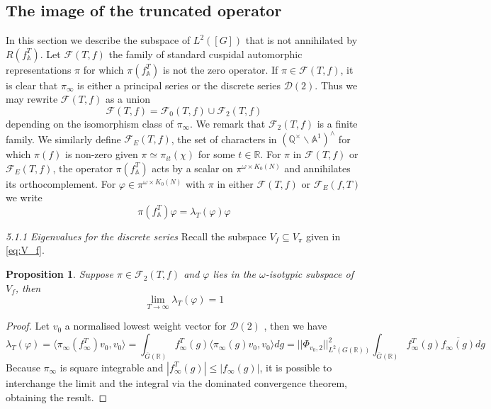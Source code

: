 \documentclass{article}
\newtheorem{proposition}[theorem]{Proposition}
\numberwithin{equation}{section}
\begin{document}
\subsection{The image of the truncated operator}
In this section we describe the subspace of $L^2([G])$ that is not annihilated by $R(f_\mathbb{A}^T)$. Let $\mathcal{F}(T,f)$ the family of standard cuspidal automorphic representations $\pi$ for which $\pi(f_\mathbb{A}^T)$ is not the zero operator. If $\pi \in \mathcal{F}(T,f)$, it is clear that $\pi_\infty$ is either a principal series or the discrete series $\mathcal{D}(2)$. Thus we may rewrite $\mathcal{F}(T,f)$ 
as a union
\begin{equation}
\mathcal{F}(T,f) = \mathcal{F}_0(T,f)\cup\mathcal{F}_2(T,f)
\end{equation}
depending on the isomorphism class of $\pi_\infty$. We remark that $\mathcal{F}_2(T,f)$ is a finite family. We similarly define $\mathcal{F}_E(T,f)$, the set of characters in $(\mathbb{Q}^\times \backslash \mathbb{A}^1)^\wedge$ for which $\pi(f)$ is non-zero given $\pi\simeq\pi_{it}(\chi)$ for some $t \in \mathbb{R}$. For $\pi$ in $\mathcal{F}(T,f)$ or $\mathcal{F}_E(T,f)$, the operator $\pi(f_\mathbb{A}^T)$ acts by a scalar on $\pi^{\omega\times K_0(N)}$ and annihilates its orthocomplement. For $\varphi \in \pi^{\omega \times K_0(N)}$ with $\pi$ in either $\mathcal{F}(T,f)$ or $\mathcal{F}_E(f,T)$ we write
\begin{equation}\label{eq:T-eigenvalue}
    \pi(f_\mathbb{A}^T)\varphi = \lambda_T(\varphi) \varphi
\end{equation}

\noindent \emph{5.1.1 Eigenvalues for the discrete series}
Recall the subspace $V_f \subseteq V_\pi$ given in \eqref{eq:V_f}.
\begin{proposition}\label{prop:discrete-limit}
    Suppose $\pi \in \mathcal{F}_2(T,f)$ and $\varphi$ lies in the $\omega$-isotypic subspace of $V_f$, then
    \begin{equation}
        \lim_{T \to \infty}\lambda_T(\varphi)=1
    \end{equation}
\end{proposition}
\begin{proof}
    Let $v_0$ a normalised lowest weight vector for $\mathcal{D}(2)$ , then we have
    \begin{equation}
        \lambda_T(\varphi)=\langle \pi_\infty(f_\infty^T)v_0, v_0 \rangle= \int_{\overline{G}(\mathbb{R})}f_\infty^T(g)\langle \pi_\infty(g)v_0,v_0\rangle dg=||\Phi_{v_0,2}||_{L^2(G(\mathbb{R}))}^2\int_{\overline{G}(\mathbb{R})}f_\infty^T(g) \overline{f_\infty(g)}dg
    \end{equation}
    Because $\pi_\infty$ is square integrable and $|f_\infty^T(g)|\leq |f_\infty(g)|$, it is possible to interchange the limit and the integral via the dominated convergence theorem, obtaining the result.
\end{proof}
\end{document}
